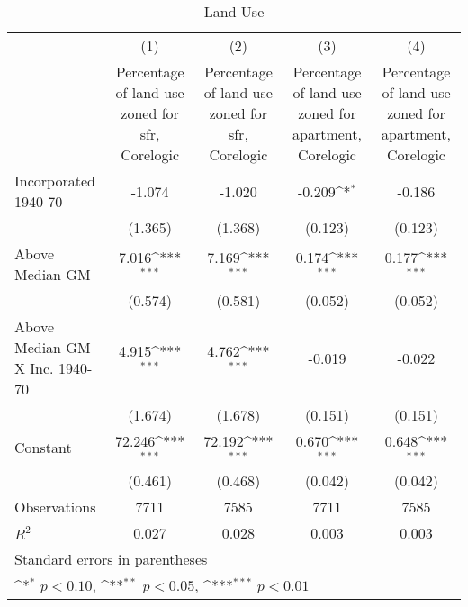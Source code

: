 \begin{table}[htbp]\centering
\def\sym#1{\ifmmode^{#1}\else\(^{#1}\)\fi}
\caption{Land Use}
\begin{tabular}{l*{4}{c}}
\hline\hline
                    &\multicolumn{1}{c}{(1)}&\multicolumn{1}{c}{(2)}&\multicolumn{1}{c}{(3)}&\multicolumn{1}{c}{(4)}\\
                    &\multicolumn{1}{c}{Percentage of land use zoned for sfr, Corelogic}&\multicolumn{1}{c}{Percentage of land use zoned for sfr, Corelogic}&\multicolumn{1}{c}{Percentage of land use zoned for apartment, Corelogic}&\multicolumn{1}{c}{Percentage of land use zoned for apartment, Corelogic}\\
\hline
Incorporated 1940-70&      -1.074         &      -1.020         &      -0.209\sym{*}  &      -0.186         \\
                    &     (1.365)         &     (1.368)         &     (0.123)         &     (0.123)         \\
[1em]
Above Median GM     &       7.016\sym{***}&       7.169\sym{***}&       0.174\sym{***}&       0.177\sym{***}\\
                    &     (0.574)         &     (0.581)         &     (0.052)         &     (0.052)         \\
[1em]
Above Median GM X Inc. 1940-70&       4.915\sym{***}&       4.762\sym{***}&      -0.019         &      -0.022         \\
                    &     (1.674)         &     (1.678)         &     (0.151)         &     (0.151)         \\
[1em]
Constant            &      72.246\sym{***}&      72.192\sym{***}&       0.670\sym{***}&       0.648\sym{***}\\
                    &     (0.461)         &     (0.468)         &     (0.042)         &     (0.042)         \\
\hline
Observations        &        7711         &        7585         &        7711         &        7585         \\
\(R^{2}\)           &       0.027         &       0.028         &       0.003         &       0.003         \\
\hline\hline
\multicolumn{5}{l}{\footnotesize Standard errors in parentheses}\\
\multicolumn{5}{l}{\footnotesize \sym{*} \(p<0.10\), \sym{**} \(p<0.05\), \sym{***} \(p<0.01\)}\\
\end{tabular}
\end{table}
